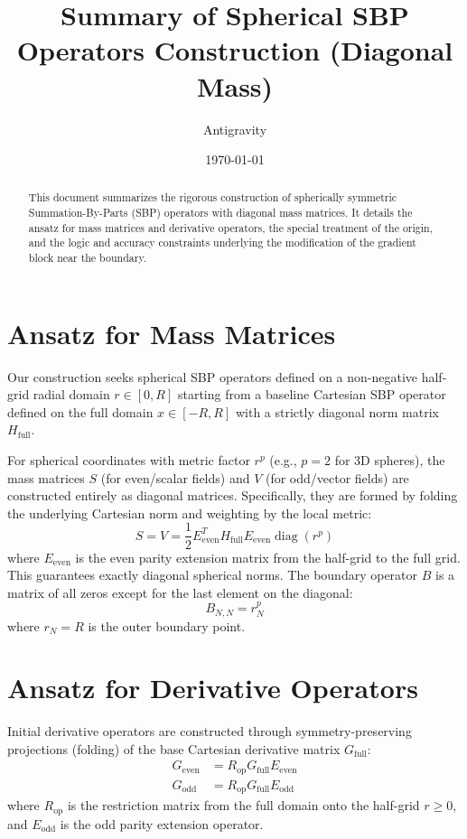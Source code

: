 \documentclass[reprint,amsmath,amssymb,aps]{revtex4-2}
\begin{document}
\title{Summary of Spherical SBP Operators Construction (Diagonal Mass)}
\author{Antigravity}
\date{\today}

\begin{abstract}
This document summarizes the rigorous construction of spherically symmetric Summation-By-Parts (SBP) operators with diagonal mass matrices. It details the ansatz for mass matrices and derivative operators, the special treatment of the origin, and the logic and accuracy constraints underlying the modification of the gradient block near the boundary.
\end{abstract}

\maketitle

\section{Ansatz for Mass Matrices}
Our construction seeks spherical SBP operators defined on a non-negative half-grid radial domain $r \in [0, R]$ starting from a baseline Cartesian SBP operator defined on the full domain $x \in [-R, R]$ with a strictly diagonal norm matrix $H_{\text{full}}$.

For spherical coordinates with metric factor $r^p$ (e.g., $p=2$ for 3D spheres), the mass matrices $S$ (for even/scalar fields) and $V$ (for odd/vector fields) are constructed entirely as diagonal matrices. Specifically, they are formed by folding the underlying Cartesian norm and weighting by the local metric:
\begin{equation}
    S = V = \frac{1}{2} E_{\text{even}}^T H_{\text{full}} E_{\text{even}} \operatorname{diag}(r^p)
\end{equation}
where $E_{\text{even}}$ is the even parity extension matrix from the half-grid to the full grid. This guarantees exactly diagonal spherical norms. 
The boundary operator $B$ is a matrix of all zeros except for the last element on the diagonal:
\begin{equation}
    B_{N,N} = r_N^p
\end{equation}
where $r_N = R$ is the outer boundary point.

\section{Ansatz for Derivative Operators}
Initial derivative operators are constructed through symmetry-preserving projections (folding) of the base Cartesian derivative matrix $G_{\text{full}}$:
\begin{align}
    G_{\text{even}} &= R_{\text{op}} G_{\text{full}} E_{\text{even}} \\
    G_{\text{odd}} &= R_{\text{op}} G_{\text{full}} E_{\text{odd}}
\end{align}
where $R_{\text{op}}$ is the restriction matrix from the full domain onto the half-grid $r \ge 0$, and $E_{\text{odd}}$ is the odd parity extension operator.
\end{document}
